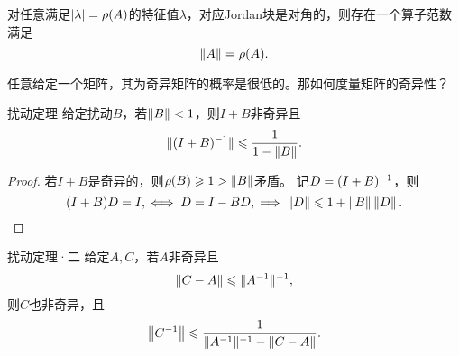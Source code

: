 \begin{remark}
    对任意满足$\left\lvert\lambda\right\rvert=\rho(A)$的特征值$\lambda$，对应Jordan块是对角的，则存在一个算子范数满足
    \[
        \left\lVert A\right\rVert=\rho(A).
    \]
\end{remark}

任意给定一个矩阵，其为奇异矩阵的概率是很低的。那如何度量矩阵的奇异性？%

\begin{theorem}
    {扰动定理}{}
    给定扰动$B$，若$\left\lVert B\right\rVert<1$，则$I+B$非奇异且
    \begin{equation}
        \lVert(I+B)^{-1}\rVert\leqslant\frac1{1-\left\lVert B\right\rVert}.
    \end{equation}
\end{theorem}

\begin{proof}
    若$I+B$是奇异的，则$\rho(B)\geqslant 1>\left\lVert B\right\rVert$矛盾。
    记$D=(I+B)^{-1}$，则 
    \[
        (I+B)D=I,\iff D=I-BD,\implies \left\lVert D\right\rVert\leqslant 1+\left\lVert B\right\rVert\left\lVert D\right\rVert.
        \qedhere
    \]
\end{proof}

\begin{theorem}
    {扰动定理·二}{}
    给定$A,C$，若$A$非奇异且
    \[
        \left\lVert C-A\right\rVert\leqslant\lVert A^{-1}\rVert^{-1},
    \]
    则$C$也非奇异，且
    \begin{equation}
        \left\lVert C^{-1}\right\rVert\leqslant\frac{1}{\lVert A^{-1}\rVert^{-1}-\left\lVert C-A\right\rVert}.
    \end{equation}
\end{theorem}



